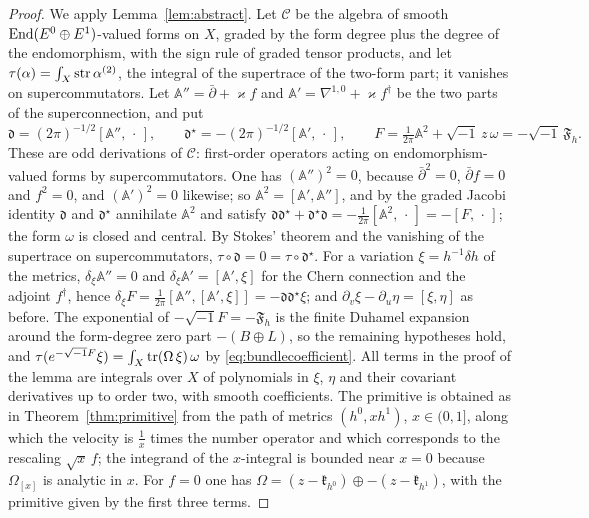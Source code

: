 \begin{proof}
We apply Lemma~\ref{lem:abstract}. Let $\mathcal C$ be the algebra of smooth
$\operatorname{End}(E^0\oplus E^1)$-valued forms on $X$, graded by the form degree plus the
degree of the endomorphism, with the sign rule of graded tensor products, and
let $\tau(\alpha)=\int_X\operatorname{str}\alpha^{(2)}$, the integral of the supertrace of
the two-form part; it vanishes on supercommutators. Let
$\mathbb A''=\bar\partial+\varkappa f$ and
$\mathbb A'=\nabla^{1,0}+\varkappa f^\dagger$ be the two parts of the
superconnection, and put
\[
 \mathfrak d=(2\pi)^{-1/2}[\mathbb A'',\,\cdot\,],\qquad
 \mathfrak d^\star=-(2\pi)^{-1/2}[\mathbb A',\,\cdot\,],\qquad
 F=\tfrac1{2\pi}\mathbb A^2+\sqrt{-1}\,z\,\omega=-\sqrt{-1}\,\mathfrak F_h .
\]
These are odd derivations of $\mathcal C$: first-order operators acting on
endomorphism-valued forms by supercommutators. One has
$(\mathbb A'')^2=0$, because $\bar\partial^2=0$, $\bar\partial f=0$ and
$f^2=0$, and $(\mathbb A')^2=0$ likewise; so
$\mathbb A^2=[\mathbb A',\mathbb A'']$, and by the graded Jacobi identity
$\mathfrak d$ and $\mathfrak d^\star$ annihilate $\mathbb A^2$ and satisfy
$\mathfrak d\mathfrak d^\star+\mathfrak d^\star\mathfrak d
=-\frac1{2\pi}[\mathbb A^2,\,\cdot\,]=-[F,\,\cdot\,]$; the form $\omega$ is
closed and central. By Stokes' theorem and the vanishing of the supertrace
on supercommutators, $\tau\circ\mathfrak d=0=\tau\circ\mathfrak d^\star$. For
a variation $\xi=h^{-1}\delta h$ of the metrics, $\delta_\xi\mathbb A''=0$ and
$\delta_\xi\mathbb A'=[\mathbb A',\xi]$ for the Chern connection and the
adjoint $f^\dagger$, hence
$\delta_\xi F=\frac1{2\pi}[\mathbb A'',[\mathbb A',\xi]]=-\mathfrak d\mathfrak d^\star\xi$;
and $\partial_v\xi-\partial_u\eta=[\xi,\eta]$ as before. The exponential of
$-\sqrt{-1}F=-\mathfrak F_h$ is the finite Duhamel expansion around the
form-degree zero part $-(B\oplus L)$, so the remaining hypotheses hold, and
$\tau(e^{-\sqrt{-1}F}\xi)=\int_X\operatorname{tr}(\Omega\,\xi)\,\omega$ by
\eqref{eq:bundlecoefficient}. All terms in the proof of the lemma are
integrals over $X$ of polynomials in $\xi$, $\eta$ and their covariant
derivatives up to order two, with smooth coefficients. The
primitive is obtained as in Theorem~\ref{thm:primitive} from the path of
metrics $(h^0,xh^1)$, $x\in(0,1]$, along which the velocity is $\frac1x$
times the number operator and which corresponds to the rescaling
$\sqrt x\,f$; the integrand of the $x$-integral is bounded near $x=0$ because
$\Omega_{[x]}$ is analytic in $x$. For $f=0$ one has
$\Omega=(z-\mathfrak k_{h^0})\oplus-(z-\mathfrak k_{h^1})$, with the primitive
given by the first three terms.
\end{proof}

